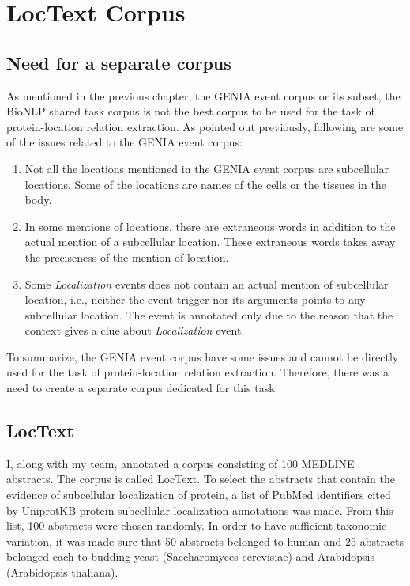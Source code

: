 \chapter{LocText Corpus}\label{chapter:corpus}

\section{Need for a separate corpus}

As mentioned in the previous chapter, the GENIA event corpus or its subset, the BioNLP shared task corpus is not the best corpus to be used for the task of protein-location relation extraction. As pointed out previously, following are some of the issues related to the GENIA event corpus:

\begin{enumerate}

\item Not all the locations mentioned in the GENIA event corpus are subcellular locations. Some of the locations are names of the cells or the tissues in the body.

\item In some mentions of locations, there are extraneous words in addition to the actual  mention of a subcellular location. These extraneous words takes away the preciseness of the mention of location.

\item Some \textit{Localization} events does not contain an actual mention of subcellular location, i.e., neither the event trigger nor its arguments points to any subcellular location. The event is annotated only due to the reason that the context gives a clue about \textit{Localization} event.

\end{enumerate}

To summarize, the GENIA event corpus have some issues and cannot be directly used for the task of protein-location relation extraction. Therefore, there was a need to create a separate corpus dedicated for this task.

\section{LocText}

I, along with my team, annotated a corpus consisting of 100 MEDLINE \cite{medline} abstracts. The corpus is called LocText. To select the abstracts that contain the evidence of subcellular localization of protein, a list of PubMed \cite{pubmed} identifiers cited by UniprotKB \cite{magrane2011uniprot} protein subcellular localization annotations was made. From this list, 100 abstracts were chosen randomly. In order to have sufficient taxonomic variation, it was made sure that 50 abstracts belonged to human and 25 abstracts belonged each to budding yeast (Saccharomyces cerevisiae) and Arabidopsis (Arabidopsis thaliana).


